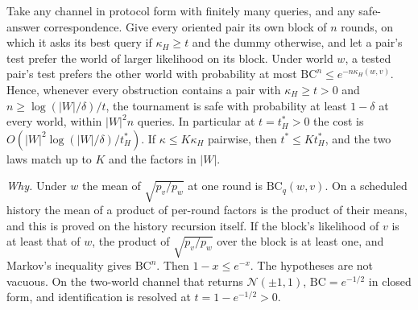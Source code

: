 \begin{theorem}
\label{thm:hellupper}
Take any channel in protocol form with finitely many queries, and any safe-answer
correspondence. Give every oriented pair its own block of $n$ rounds, on which it asks its best
query if $\kappa_{H}\ge t$ and the dummy otherwise, and let a pair's test prefer the world of
larger likelihood on its block. Under world $w$, a tested pair's test prefers the other world
with probability at most $\mathrm{BC}^{n}\le e^{-n\kappa_{H}(w,v)}$. Hence, whenever every
obstruction contains a pair with $\kappa_{H}\ge t>0$ and $n\ge\log(|W|/\delta)/t$, the
tournament is safe with probability at least $1-\delta$ at every world, within $|W|^{2}n$
queries. In particular at $t=t^{*}_{H}>0$ the cost is $O(|W|^{2}\log(|W|/\delta)/t^{*}_{H})$.
If $\kappa\le K\kappa_{H}$ pairwise, then $t^{*}\le Kt^{*}_{H}$, and the two laws match up to $K$
and the factors in $|W|$.
\end{theorem}


\emph{Why.} Under $w$ the mean of $\sqrt{p_{v}/p_{w}}$ at one round is $\mathrm{BC}_{q}(w,v)$. On a
scheduled history the mean of a product of per-round factors is the product of their means, and
this is proved on the history recursion itself. If the block's likelihood of $v$ is at least that
of $w$, the product of $\sqrt{p_{v}/p_{w}}$ over the block is at least one, and Markov's
inequality gives $\mathrm{BC}^{n}$. Then $1-x\le e^{-x}$. The hypotheses are not vacuous. On the
two-world channel that returns $\mathcal N(\pm1,1)$, $\mathrm{BC}=e^{-1/2}$ in closed form, and
identification is resolved at $t=1-e^{-1/2}>0$.


